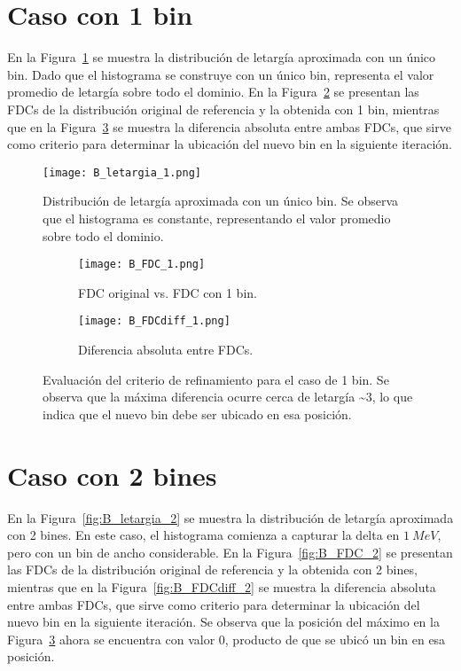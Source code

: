 \section*{Caso con 1 bin}

En la Figura~\ref{fig:B_letargia_1} se muestra la distribución de letargía aproximada con un único bin. Dado que el histograma se construye con un único bin, representa el valor promedio de letargía sobre todo el dominio. En la Figura~\ref{fig:B_FDC_1} se presentan las FDCs de la distribución original de referencia y la obtenida con 1 bin, mientras que en la Figura~\ref{fig:B_FDCdiff_1} se muestra la diferencia absoluta entre ambas FDCs, que sirve como criterio para determinar la ubicación del nuevo bin en la siguiente iteración.

\begin{figure}[H]
    \centering
    \texttt{[image: B\_letargia\_1.png]}
    \caption{Distribución de letargía aproximada con un único bin. Se observa que el histograma es constante, representando el valor promedio sobre todo el dominio.}
    \label{fig:B_letargia_1}
\end{figure}

\begin{figure}[H]
    \centering
    \begin{subfigure}[b]{0.46\textwidth}
        \texttt{[image: B\_FDC\_1.png]}
        \caption{FDC original vs. FDC con 1 bin.}
        \label{fig:B_FDC_1}
    \end{subfigure}
    \hfill
    \begin{subfigure}[b]{0.46\textwidth}
        \texttt{[image: B\_FDCdiff\_1.png]}
        \caption{Diferencia absoluta entre FDCs.}
        \label{fig:B_FDCdiff_1}
    \end{subfigure}
    \caption{Evaluación del criterio de refinamiento para el caso de 1 bin. Se observa que la máxima diferencia ocurre cerca de letargía \sim 3, lo que indica que el nuevo bin debe ser ubicado en esa posición.}
    \label{fig:B_FDC_1_1}
\end{figure}
  
\section*{Caso con 2 bines}

En la Figura~\ref{fig:B_letargia_2} se muestra la distribución de letargía aproximada con 2 bines. En este caso, el histograma comienza a capturar la delta en $1~MeV$, pero con un bin de ancho considerable. En la Figura~\ref{fig:B_FDC_2} se presentan las FDCs de la distribución original de referencia y la obtenida con 2 bines, mientras que en la Figura~\ref{fig:B_FDCdiff_2} se muestra la diferencia absoluta entre ambas FDCs, que sirve como criterio para determinar la ubicación del nuevo bin en la siguiente iteración. Se observa que la posición del máximo en la Figura~\ref{fig:B_FDCdiff_1} ahora se encuentra con valor 0, producto de que se ubicó un bin en esa posición.

